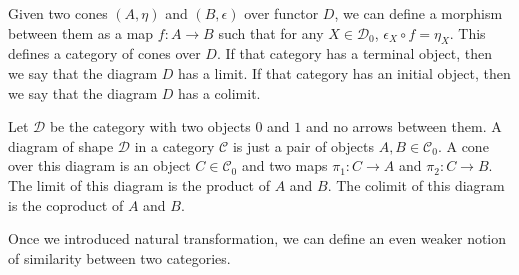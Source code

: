 Given two cones $(A,\eta)$ and $(B,\epsilon)$ over functor $D$,
we can define a morphism between them as a map $f:A\to B$ such that
for any $X\in\mathcal{D}_0$, $\epsilon_X\circ f=\eta_X$.
This defines a category of cones over $D$.
If that category has a terminal object, 
then we say that the diagram $D$ has a limit.
If that category has an initial object, 
then we say that the diagram $D$ has a colimit.

\begin{example}
    Let $\mathcal{D}$ be the category with two objects $0$ and $1$ 
    and no arrows between them.
    A diagram of shape $\mathcal{D}$ in a category $\mathcal{C}$
    is just a pair of objects $A,B\in\mathcal{C}_0$.
    A cone over this diagram is an object $C\in\mathcal{C}_0$
    and two maps $\pi_1:C\to A$ and $\pi_2:C\to B$.
    The limit of this diagram is the product of $A$ and $B$.
    The colimit of this diagram is the coproduct of $A$ and $B$.
\end{example}

Once we introduced natural transformation,
we can define an even weaker notion of similarity between two categories.
